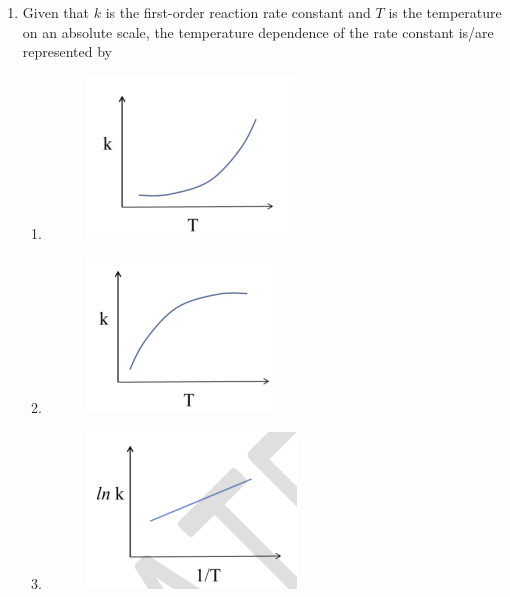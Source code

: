 \documentclass[12pt]{article}
\begin{document}
\begin{enumerate}
(GATE XE 2024)

\item Given that $k$ is the first-order reaction rate constant and $T$ is the temperature on an absolute scale, the temperature dependence of the rate constant is/are represented by

\begin{enumerate}
\item \begin{figure}[H]
    \centering
    \includegraphics[width=0.5\columnwidth]{figs/ass5_c_q60_a.png}
    \caption{}
    \label{fig:placeholder}
\end{figure}
\item \begin{figure}[H]
    \centering
    \includegraphics[width=0.5\columnwidth]{figs/ass5_c_q60_b.png}
    \caption{}
    \label{fig:placeholder}
\end{figure}
\item \begin{figure}[H]
    \centering
    \includegraphics[width=0.5\columnwidth]{figs/ass5_c_q60_c.png}

\end{figure}
\end{enumerate}
\end{enumerate}
\end{document}
